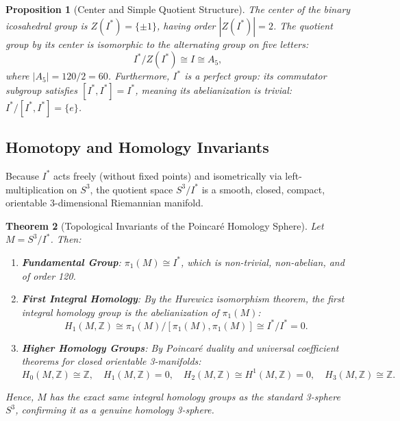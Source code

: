 \documentclass[11pt,a4paper]{article}
\newtheorem{theorem}{Theorem}[section]
\newtheorem{proposition}[theorem]{Proposition}
\theoremstyle{definition}
\begin{document}
\begin{proposition}[Center and Simple Quotient Structure]
The center of the binary icosahedral group is $Z(I^*) = \{\pm 1\}$, having order $|Z(I^*)| = 2$. The quotient group by its center is isomorphic to the alternating group on five letters:
\begin{equation}
I^* / Z(I^*) \cong I \cong A_5,
\end{equation}
where $|A_5| = 120 / 2 = 60$. Furthermore, $I^*$ is a perfect group: its commutator subgroup satisfies $[I^*, I^*] = I^*$, meaning its abelianization is trivial: $I^* / [I^*, I^*] = \{e\}$.
\end{proposition}

\subsection{Homotopy and Homology Invariants}
Because $I^*$ acts freely (without fixed points) and isometrically via left-multiplication on $S^3$, the quotient space $S^3 / I^*$ is a smooth, closed, compact, orientable 3-dimensional Riemannian manifold.

\begin{theorem}[Topological Invariants of the Poincar\'e Homology Sphere]
Let $M = S^3 / I^*$. Then:
\begin{enumerate}
\item \textbf{Fundamental Group}: $\pi_1(M) \cong I^*$, which is non-trivial, non-abelian, and of order 120.
\item \textbf{First Integral Homology}: By the Hurewicz isomorphism theorem, the first integral homology group is the abelianization of $\pi_1(M)$:
\begin{equation}
H_1(M, \mathbb{Z}) \cong \pi_1(M) / [\pi_1(M), \pi_1(M)] \cong I^* / I^* = 0.
\end{equation}
\item \textbf{Higher Homology Groups}: By Poincar\'e duality and universal coefficient theorems for closed orientable 3-manifolds:
\begin{equation}
H_0(M, \mathbb{Z}) \cong \mathbb{Z}, \quad H_1(M, \mathbb{Z}) = 0, \quad H_2(M, \mathbb{Z}) \cong H^1(M, \mathbb{Z}) = 0, \quad H_3(M, \mathbb{Z}) \cong \mathbb{Z}.
\end{equation}
\end{enumerate}
Hence, $M$ has the exact same integral homology groups as the standard 3-sphere $S^3$, confirming it as a genuine homology 3-sphere.
\end{theorem}
\end{document}
